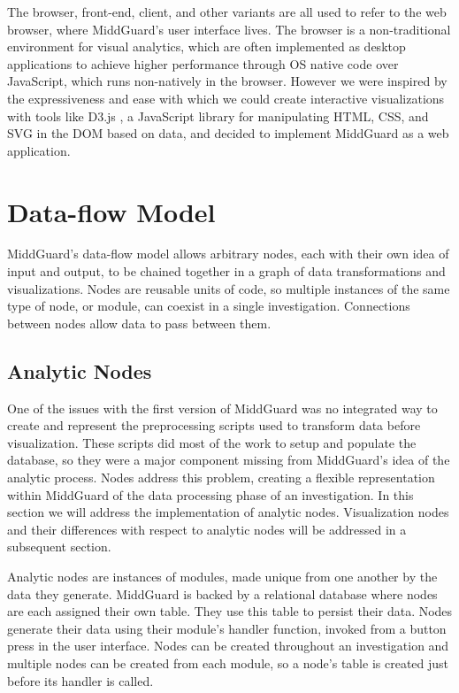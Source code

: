 \documentclass[midd]{thesis}
\begin{document}
The browser, front-end, client, and other variants are all used to refer to the
web browser, where MiddGuard's user interface lives. The browser is a
non-traditional environment for visual analytics, which are often implemented as
desktop applications to achieve higher performance through OS native code over
JavaScript, which runs non-natively in the browser. However we were inspired by
the expressiveness and ease with which we could create interactive
visualizations with tools like D3.js \cite{2011-d3}, a JavaScript library for
manipulating HTML, CSS, and SVG in the DOM based on data, and decided to
implement MiddGuard as a web application.

\section{Data-flow Model}

MiddGuard's data-flow model allows arbitrary nodes, each with their own idea of
input and output, to be chained together in a graph of data transformations and
visualizations. Nodes are reusable units of code, so multiple instances of the
same type of node, or module, can coexist in a single investigation. Connections
between nodes allow data to pass between them.

\subsection{Analytic Nodes}

One of the issues with the first version of MiddGuard was no integrated way to
create and represent the preprocessing scripts used to transform data before
visualization. These scripts did most of the work to setup and populate the
database, so they were a major component missing from MiddGuard's idea of the
analytic process. Nodes address this problem, creating a flexible representation
within MiddGuard of the data processing phase of an investigation. In this
section we will address the implementation of analytic nodes. Visualization
nodes and their differences with respect to analytic nodes will be addressed in
a subsequent section.

Analytic nodes are instances of modules, made unique from one another by the
data they generate. MiddGuard is backed by a relational database where nodes are
each assigned their own table. They use this table to persist their data. Nodes
generate their data using their module's handler function, invoked from a button
press in the user interface. Nodes can be created throughout an investigation
and multiple nodes can be created from each module, so a node's table is created
just before its handler is called.
\end{document}
